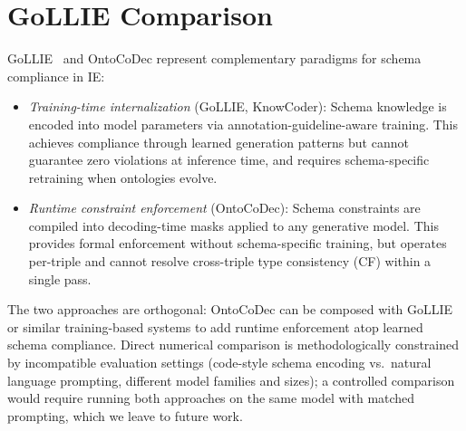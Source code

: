 
\section{GoLLIE Comparison}
\label{app:gollie-comparison}

GoLLIE~\cite{sainz2024gollie} and OntoCoDec represent complementary paradigms for schema compliance in IE:

\begin{itemize}[nosep,leftmargin=*]
\item \emph{Training-time internalization} (GoLLIE, KnowCoder): Schema knowledge is encoded into model parameters via annotation-guideline-aware training. This achieves compliance through learned generation patterns but cannot guarantee zero violations at inference time, and requires schema-specific retraining when ontologies evolve.
\item \emph{Runtime constraint enforcement} (OntoCoDec): Schema constraints are compiled into decoding-time masks applied to any generative model. This provides formal enforcement without schema-specific training, but operates per-triple and cannot resolve cross-triple type consistency (CF) within a single pass.
\end{itemize}

The two approaches are orthogonal: OntoCoDec can be composed with GoLLIE or similar training-based systems to add runtime enforcement atop learned schema compliance.
Direct numerical comparison is methodologically constrained by incompatible evaluation settings (code-style schema encoding vs.\ natural language prompting, different model families and sizes); a controlled comparison would require running both approaches on the same model with matched prompting, which we leave to future work.
